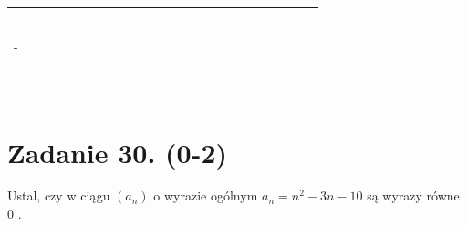 \documentclass[10pt]{article}
\begin{document}
\begin{center}
\begin{tabular}{|c|c|c|c|c|c|c|c|c|c|c|c|c|c|c|c|c|c|c|c|c|c|c|c|}
\hline
 &  &  &  &  &  &  &  &  &  &  &  &  &  &  &  &  &  &  &  &  &  &  &  \\
\hline
 &  &  &  &  &  &  &  &  &  &  &  &  &  &  &  &  &  &  &  &  &  &  &  \\
\hline
 &  &  &  &  &  &  &  &  &  &  &  &  &  &  &  &  &  &  &  &  &  &  &  \\
\hline
 &  &  &  &  &  &  &  &  &  &  &  &  &  &  &  &  &  &  &  &  &  &  &  \\
\hline
 &  &  &  &  &  &  &  &  &  &  &  &  &  &  &  &  &  &  &  &  &  &  &  \\
\hline
 &  &  &  &  &  &  &  &  &  &  &  &  &  &  &  &  &  &  &  &  &  &  &  \\
\hline
 &  &  &  &  &  &  &  &  &  &  &  &  &  &  &  &  &  &  &  &  &  &  &  \\
\hline
- &  &  &  &  &  &  &  &  &  &  &  &  &  &  &  &  &  &  &  &  &  &  &  \\
\hline
 &  &  &  &  &  &  &  &  &  &  &  &  &  &  &  &  &  &  &  &  &  &  &  \\
\hline
 &  &  &  &  &  &  &  &  &  &  &  &  &  &  &  &  &  &  &  &  &  &  &  \\
\hline
 &  &  &  &  &  &  &  &  &  &  &  &  &  &  &  &  &  &  &  &  &  &  &  \\
\hline
 &  &  &  &  &  &  &  &  &  &  &  &  &  &  &  &  &  &  &  &  &  &  &  \\
\hline
 &  &  &  &  &  &  &  &  &  &  &  &  &  &  &  &  &  &  &  &  &  &  &  \\
\hline
 &  &  &  &  &  &  &  &  &  &  &  &  &  &  &  &  &  &  &  &  &  &  &  \\
\hline
 &  &  &  &  &  &  &  &  &  &  &  &  &  &  &  &  &  &  &  &  &  &  &  \\
\hline
 &  &  &  &  &  &  &  &  &  &  &  &  &  &  &  &  &  &  &  &  &  &  &  \\
\hline
\end{tabular}
\end{center}

\section*{Zadanie 30. (0-2)}
Ustal, czy w ciągu \(\left(a_{n}\right)\) o wyrazie ogólnym \(a_{n}=n^{2}-3 n-10\) są wyrazy równe 0 .
\end{document}
